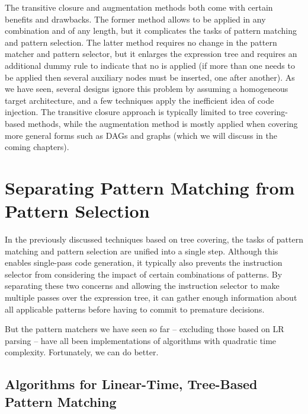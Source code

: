 {The \gls{transitive closure} and augmentation methods both come with certain
benefits and drawbacks.
%
The former method allows \tchainRules to be applied in
any combination and of any length, but it complicates the tasks of \gls{pattern
  matching} and \gls{pattern selection}.
%
The latter method requires no change in
the \gls{pattern matcher} and \gls{pattern selector}, but it enlarges the
\gls{expression tree} and requires an additional dummy \gls{rule} to indicate that
no \tchainRule is applied (if more than one \tchainRule needs to be applied then
several auxiliary \glspl{node} must be inserted, one after another).
%
As we have
seen, several designs ignore this problem by assuming a homogeneous target
architecture, and a few techniques apply the inefficient idea of code injection.
The \gls{transitive closure} approach is typically limited to \gls{tree
  covering}-based methods, while the augmentation method is mostly applied when
covering more general forms such as \glsdesc{DAG}s and \glspl{graph} (which we
will discuss in the coming chapters).


\section{Separating Pattern Matching from Pattern Selection}

In the previously discussed techniques based on \gls{tree covering}, the tasks
of \gls{pattern matching} and \gls{pattern selection} are unified into a single
step.
%
Although this enables single-pass \gls{code generation}, it typically also
prevents the \gls{instruction selector} from considering the impact of certain
combinations of \glspl{pattern}.
%
By separating these two concerns and allowing
the \gls{instruction selector} to make multiple passes over the \gls{expression tree}, it can gather enough information about all applicable \glspl{pattern}
before having to commit to premature decisions.

But the \glspl{pattern matcher} we have seen so far -- excluding those based on
\gls{LR parsing} -- have all been implementations of algorithms with quadratic
time complexity.
%
 Fortunately, we can do better.


\subsection{Algorithms for Linear-Time, Tree-Based Pattern Matching}

}
